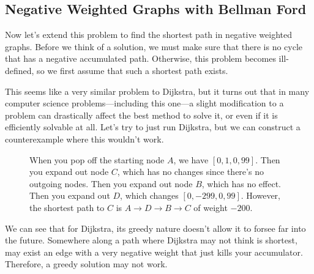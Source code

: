 \subsection{Negative Weighted Graphs with Bellman Ford} 

  Now let's extend this problem to find the shortest path in negative weighted graphs. Before we think of a solution, we must make sure that there is no cycle that has a negative accumulated path. Otherwise, this problem becomes ill-defined, so we first assume that such a shortest path exists. 

  This seems like a very similar problem to Dijkstra, but it turns out that in many computer science problems---including this one---a slight modification to a problem can drastically affect the best method to solve it, or even if it is efficiently solvable at all. Let's try to just run Dijkstra, but we can construct a counterexample where this wouldn't work. 

  \begin{figure}[H]
    \centering 
    \caption{When you pop off the starting node $A$, we have $[0, 1, 0, 99]$. Then you expand out node $C$, which has no changes since there's no outgoing nodes. Then you expand out node $B$, which has no effect. Then you expand out $D$, which changes $[0, -299, 0, 99]$. However, the shortest path to $C$ is $A \rightarrow D \rightarrow B \rightarrow C$ of weight $-200$.}
  \end{figure} 

  We can see that for Dijkstra, its greedy nature doesn't allow it to forsee far into the future. Somewhere along a path where Dijkstra may not think is shortest, may exist an edge with a very negative weight that just kills your accumulator. Therefore, a greedy solution may not work. 


